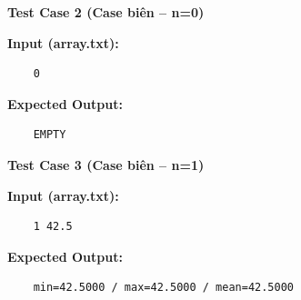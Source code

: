     \vspace{0.5cm}

    \textbf{Test Case 2 (Case biên -- n=0)}

    \textbf{Input (array.txt):}
    \begin{lstlisting}
    0\end{lstlisting}

    \textbf{Expected Output:}
    \begin{lstlisting}
    EMPTY\end{lstlisting}
    \textbf{Test Case 3 (Case biên -- n=1)}

    \textbf{Input (array.txt):}
    \begin{lstlisting}
    1 42.5\end{lstlisting}

    \textbf{Expected Output:}
    \begin{lstlisting}
    min=42.5000 / max=42.5000 / mean=42.5000\end{lstlisting}